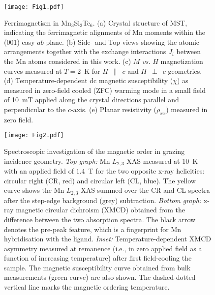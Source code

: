 \documentclass[preprint,amsmath,amssymb,aps,nofootinbib,superscriptaddress]{revtex4-2}
\begin{document}



\begin{figure*}
\texttt{[image: Fig1.pdf]}
\caption{\label{fig:fig1} Ferrimagnetism in Mn$_{3}$Si$_{2}$Te$_{6}$. (a) Crystal structure of MST, indicating the ferrimagnetic alignments of Mn moments within the (001) easy $ab$-plane. (b) Side- and Top-views showing the atomic arrangements together with the exchange interactions $J_i$ between the Mn atoms considered in this work. (c) $M$ {\it vs.} $H$ magnetization curves measured at $T=2$~K for $H$~$\parallel$~$c$ and $H$~$\perp$~$c$ geometries. (d) Temperature-dependent dc magnetic susceptibility ($\chi$) as measured in zero-field cooled (ZFC) warming mode in a small field of 10~mT applied along the crystal directions parallel and perpendicular to the $c$-axis. (e) Planar resistivity ($\rho_{xx}$) measured in zero field.}
\end{figure*}

\begin{figure}
\texttt{[image: Fig2.pdf]}
\caption{\label{fig:fig2} Spectroscopic investigation of the magnetic order in grazing incidence geometry. \emph{Top graph:} Mn $L_{2,3}$ XAS measured at 10~K with an applied field of $1.4$~T for the two opposite x-ray helicities: circular right (CR, red) and circular left (CL, blue). The yellow curve shows the Mn $L_{2,3}$ XAS summed over the CR and CL spectra after the step-edge background (grey) subtraction. \emph{Bottom graph:} x-ray magnetic circular dichroism (XMCD) obtained from the difference between the two absorption spectra. The black arrow denotes the pre-peak feature, which is a fingerprint for Mn hybridisation with the ligand. \emph{Inset:} Temperature-dependent XMCD asymmetry measured at remanence (i.e., in zero applied field as a function of increasing temperature) after first field-cooling the sample. The magnetic susceptibility curve obtained from bulk measurements (green curve) are also shown. The dashed-dotted vertical line marks the magnetic ordering temperature.}
\end{figure}
\end{document}
